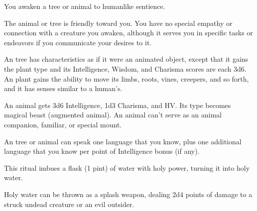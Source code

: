 \begin{spelleffect}
You awaken a tree or animal to humanlike sentience.
\par The  animal or tree is friendly toward you. You have no special empathy or connection with a creature you awaken, although it serves you in specific tasks or endeavors if you communicate your desires to it.
\par An  tree has characteristics as if it were an animated object, except that it gains the plant type and its Intelligence, Wisdom, and Charisma scores are each 3d6. An  plant gains the ability to move its limbs, roots, vines, creepers, and so forth, and it has senses similar to a human's.
\par An  animal gets 3d6 Intelligence, \plus1d3 Charisma, and  HV. Its type becomes magical beast (augmented animal). An  animal can't serve as an animal companion, familiar, or special mount.
\par An  tree or animal can speak one language that you know, plus one additional language that you know per point of Intelligence bonus (if any).
\end{spelleffect}

\begin{spelleffect}
This ritual imbues a flask (1 pint) of water with holy power, turning it into holy water.
\end{spelleffect}
\begin{spellnotes}
Holy water can be thrown as a splash weapon, dealing 2d4 points of damage to a struck undead creature or an evil outsider.
\end{spellnotes}


